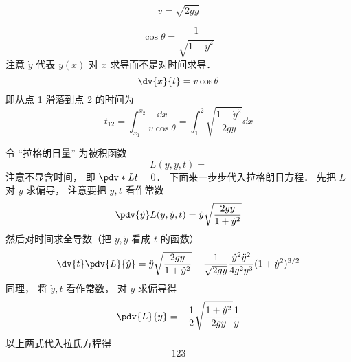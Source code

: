 

\begin{equation}
v = \sqrt{2gy}
\end{equation}

\begin{equation}
\cos\theta = \frac{1}{\sqrt{1 + \dot{y}^2}}
\end{equation}
注意 $\dot{y}$ 代表 $y(x)$ 对 $x$ 求导而不是对时间求导．
\begin{equation}
\dv{x}{t} = v\cos\theta
\end{equation}
即从点 1 滑落到点 2 的时间为
\begin{equation}
t_{12} = \int_{x_1}^{x_2} \frac{\dd{x}}{v\cos\theta} = \int_1^2 \sqrt{\frac{1 + \dot{y}^2}{2gy}} \dd{x}
\end{equation}


令 “拉格朗日量” 为被积函数
\begin{equation}
L(y, \dot{y}, t) = 
\end{equation}
注意不显含时间， 即 $\pdv*{L}{t} = 0$． 下面来一步步代入拉格朗日方程． 先把 $L$ 对 $\dot{y}$ 求偏导， 注意要把 $y, t$ 看作常数
\begin{equation}
\pdv{\dot{y}}L(y, \dot{y}, t) = \dot y\sqrt{\frac{2gy}{1+\dot{y}^2}}
\end{equation}
然后对时间求全导数（把 $y, \dot{y}$ 看成 $t$ 的函数）
\begin{equation}
\dv{t}\pdv{L}{\dot{y}} = \ddot{y}\sqrt{\frac{2gy}{1+\dot{y}^2}} - \frac{1}{\sqrt{2gy}}\frac{\dot{y}^2\ddot{y}^2}{4g^2y^3}(1+\dot{y}^2)^{3/2}
\end{equation}
同理， 将 $\dot y, t$ 看作常数， 对 $y$ 求偏导得
\begin{equation}
\pdv{L}{y} = -\frac{1}{2} \sqrt{\frac{1 + \dot{y}^2}{2gy}} \frac{1}{y}
\end{equation}
以上两式代入拉氏方程得
\begin{equation}
123
\end{equation}
